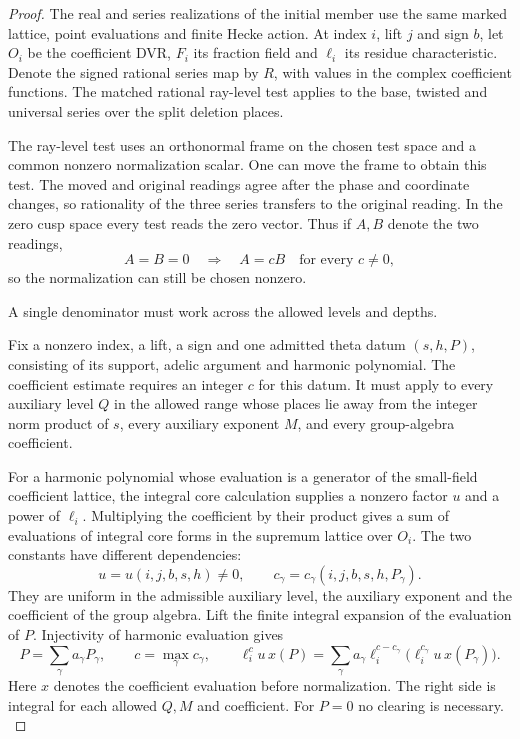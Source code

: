 \begin{proof}
The real and series realizations of the initial member use the same marked lattice, point evaluations and finite Hecke action. At index \(i\), lift \(j\) and sign \(b\), let
\(O_i\) be the coefficient DVR, \(F_i\) its fraction field
and \(\ell_i\) its residue characteristic. Denote the signed
rational series map by \(R\), with values in the complex
coefficient functions. The matched rational ray-level test
applies to the base, twisted and universal series over the
split deletion places.

The ray-level test uses an orthonormal frame on the
chosen test space and a common nonzero normalization scalar.
One can move the frame to obtain this test. The moved and
original readings agree after the phase and coordinate changes,
so rationality of the three series transfers to the original
reading. In the zero cusp space every test reads the zero vector. Thus if \(A,B\) denote the two readings,
\[
 A=B=0\quad\Longrightarrow\quad A=cB\quad\text{for every }c\ne0,
\]
so the normalization can still be chosen nonzero.
\label{cor:automorphic-realization-46}

A single denominator must work across the allowed levels and depths.

Fix a nonzero index, a lift, a sign and one admitted theta datum
\((s,h,P)\), consisting of its support, adelic argument and harmonic
polynomial. The coefficient estimate requires an integer \(c\)
for this datum. It must apply to every auxiliary level \(Q\) in the
allowed range whose places lie away from the integer norm product
of \(s\), every auxiliary exponent \(M\), and every group-algebra
coefficient.

For a harmonic
polynomial whose evaluation is a generator of the small-field
coefficient lattice, the integral core calculation supplies a
nonzero factor \(u\) and a power of \(\ell_i\). Multiplying
the coefficient by their product gives a sum of evaluations
of integral core forms in the supremum lattice over \(O_i\).
The two constants have different dependencies:
\[
 u=u(i,j,b,s,h)\ne0,\qquad
 c_\gamma=c_\gamma(i,j,b,s,h,P_\gamma).
\]
They are uniform in the admissible auxiliary level, the auxiliary
exponent and the coefficient of the group algebra.
Lift the finite integral expansion of the evaluation of \(P\).
Injectivity of harmonic evaluation gives
\[
 P=\sum_\gamma a_\gamma P_\gamma,\qquad
 c=\max_\gamma c_\gamma,\qquad
 \ell_i^c u\,x(P)=\sum_\gamma a_\gamma\ell_i^{c-c_\gamma}
                              \bigl(\ell_i^{c_\gamma}u\,x(P_\gamma)\bigr).
\]
Here \(x\) denotes the coefficient evaluation before normalization.
The right side is integral for each allowed \(Q,M\) and coefficient.
For \(P=0\) no clearing is necessary. \label{cor:automorphic-realization-47}


\end{proof}

